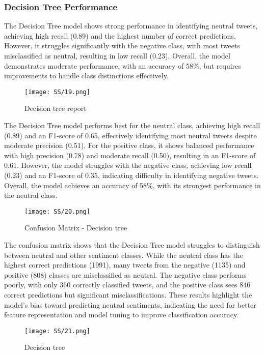 \documentclass[journal]{IEEEtran}
\begin{document}
\subsubsection*{\textbf{Decision Tree Performance}}
The Decision Tree model shows strong performance in identifying neutral tweets, achieving high recall (0.89) and the highest number of correct predictions. However, it struggles significantly with the negative class, with most tweets misclassified as neutral, resulting in low recall (0.23). Overall, the model demonstrates moderate performance, with an accuracy of 58\%, but requires improvements to handle class distinctions effectively.
\begin{figure}[H]
\centering
\texttt{[image: SS/19.png]}
\caption{Decision tree report}
\end{figure}
The Decision Tree model performs best for the neutral class, achieving high recall (0.89) and an F1-score of 0.65, effectively identifying most neutral tweets despite moderate precision (0.51). For the positive class, it shows balanced performance with high precision (0.78) and moderate recall (0.50), resulting in an F1-score of 0.61. However, the model struggles with the negative class, achieving low recall (0.23) and an F1-score of 0.35, indicating difficulty in identifying negative tweets. Overall, the model achieves an accuracy of 58\%, with its strongest performance in the neutral class.
\begin{figure}[H]
\centering
\texttt{[image: SS/20.png]}
\caption{Confusion Matrix - Decision tree }
\end{figure}
The confusion matrix shows that the Decision Tree model struggles to distinguish between neutral and other sentiment classes. While the neutral class has the highest correct predictions (1991), many tweets from the negative (1135) and positive (808) classes are misclassified as neutral. The negative class performs poorly, with only 360 correctly classified tweets, and the positive class sees 846 correct predictions but significant misclassifications. These results highlight the model's bias toward predicting neutral sentiments, indicating the need for better feature representation and model tuning to improve classification accuracy.
\begin{figure}[H]
\centering
\texttt{[image: SS/21.png]}
\caption{Decision tree }
\end{figure}
\end{document}
